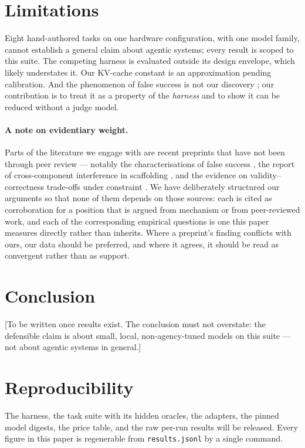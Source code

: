 \documentclass[11pt,a4paper]{article}
\newcommand{\note}[1]{\textcolor{red!70!black}{\small\textsf{[#1]}}}
\begin{document}
\section{Limitations}
\label{sec:limitations}

Eight hand-authored tasks on one hardware configuration, with one model family,
cannot establish a general claim about agentic systems; every result is scoped to
this suite. The competing harness is evaluated outside its design envelope, which
likely understates it. Our KV-cache constant is an approximation pending
calibration. And the phenomenon of false success is not our discovery
\citep{advani2026falsesuccess,cao2026corruptsuccess}; our contribution is to
treat it as a property of the \emph{harness} and to show it can be reduced
without a judge model.

\paragraph{A note on evidentiary weight.} Parts of the literature we engage with
are recent preprints that have not been through peer review --- notably the
characterisations of false success \citep{advani2026falsesuccess,%
cao2026corruptsuccess}, the report of cross-component interference in scaffolding
\citep{liu2026moreisnotbetter}, and the evidence on validity--correctness
trade-offs under constraint \citep{ray2026constrainttax}. We have deliberately
structured our arguments so that none of them depends on those sources: each is
cited as corroboration for a position that is argued from mechanism or from
peer-reviewed work, and each of the corresponding empirical questions is one this
paper measures directly rather than inherits. Where a preprint's finding
conflicts with ours, our data should be preferred, and where it agrees, it should
be read as convergent rather than as support.

\section{Conclusion}
\label{sec:conclusion}

\note{To be written once results exist. The conclusion must not overstate: the
defensible claim is about small, local, non-agency-tuned models on this suite ---
not about agentic systems in general.}

\section*{Reproducibility}

The harness, the task suite with its hidden oracles, the adapters, the pinned
model digests, the price table, and the raw per-run results will be released.
Every figure in this paper is regenerable from \texttt{results.jsonl} by a single
command.



\end{document}
